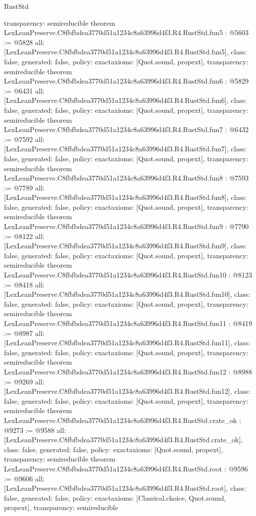 \begin{lexlean}{RustStd}
\begin{coremodule}
{  transparency: semireducible
}
theorem LexLeanPreserve.C8fbfbdea3770d51a1234c8a63996d4f3.R4.RustStd.fun5 : @5603 := @5828 {
  all: [LexLeanPreserve.C8fbfbdea3770d51a1234c8a63996d4f3.R4.RustStd.fun5],
  class: false,
  generated: false,
  policy: exact{axioms: [Quot.sound, propext]},
  transparency: semireducible
}
theorem LexLeanPreserve.C8fbfbdea3770d51a1234c8a63996d4f3.R4.RustStd.fun6 : @5829 := @6431 {
  all: [LexLeanPreserve.C8fbfbdea3770d51a1234c8a63996d4f3.R4.RustStd.fun6],
  class: false,
  generated: false,
  policy: exact{axioms: [Quot.sound, propext]},
  transparency: semireducible
}
theorem LexLeanPreserve.C8fbfbdea3770d51a1234c8a63996d4f3.R4.RustStd.fun7 : @6432 := @7592 {
  all: [LexLeanPreserve.C8fbfbdea3770d51a1234c8a63996d4f3.R4.RustStd.fun7],
  class: false,
  generated: false,
  policy: exact{axioms: [Quot.sound, propext]},
  transparency: semireducible
}
theorem LexLeanPreserve.C8fbfbdea3770d51a1234c8a63996d4f3.R4.RustStd.fun8 : @7593 := @7789 {
  all: [LexLeanPreserve.C8fbfbdea3770d51a1234c8a63996d4f3.R4.RustStd.fun8],
  class: false,
  generated: false,
  policy: exact{axioms: [Quot.sound, propext]},
  transparency: semireducible
}
theorem LexLeanPreserve.C8fbfbdea3770d51a1234c8a63996d4f3.R4.RustStd.fun9 : @7790 := @8122 {
  all: [LexLeanPreserve.C8fbfbdea3770d51a1234c8a63996d4f3.R4.RustStd.fun9],
  class: false,
  generated: false,
  policy: exact{axioms: [Quot.sound, propext]},
  transparency: semireducible
}
theorem LexLeanPreserve.C8fbfbdea3770d51a1234c8a63996d4f3.R4.RustStd.fun10 : @8123 := @8418 {
  all: [LexLeanPreserve.C8fbfbdea3770d51a1234c8a63996d4f3.R4.RustStd.fun10],
  class: false,
  generated: false,
  policy: exact{axioms: [Quot.sound, propext]},
  transparency: semireducible
}
theorem LexLeanPreserve.C8fbfbdea3770d51a1234c8a63996d4f3.R4.RustStd.fun11 : @8419 := @8987 {
  all: [LexLeanPreserve.C8fbfbdea3770d51a1234c8a63996d4f3.R4.RustStd.fun11],
  class: false,
  generated: false,
  policy: exact{axioms: [Quot.sound, propext]},
  transparency: semireducible
}
theorem LexLeanPreserve.C8fbfbdea3770d51a1234c8a63996d4f3.R4.RustStd.fun12 : @8988 := @9269 {
  all: [LexLeanPreserve.C8fbfbdea3770d51a1234c8a63996d4f3.R4.RustStd.fun12],
  class: false,
  generated: false,
  policy: exact{axioms: [Quot.sound, propext]},
  transparency: semireducible
}
theorem LexLeanPreserve.C8fbfbdea3770d51a1234c8a63996d4f3.R4.RustStd.crate_ok : @9273 := @9588 {
  all: [LexLeanPreserve.C8fbfbdea3770d51a1234c8a63996d4f3.R4.RustStd.crate_ok],
  class: false,
  generated: false,
  policy: exact{axioms: [Quot.sound, propext]},
  transparency: semireducible
}
theorem LexLeanPreserve.C8fbfbdea3770d51a1234c8a63996d4f3.R4.RustStd.root : @9596 := @9606 {
  all: [LexLeanPreserve.C8fbfbdea3770d51a1234c8a63996d4f3.R4.RustStd.root],
  class: false,
  generated: false,
  policy: exact{axioms: [Classical.choice, Quot.sound, propext]},
  transparency: semireducible
}


\end{coremodule}
\end{lexlean}
